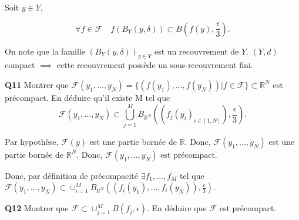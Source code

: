 \documentclass[french]{article}
\begin{document}
	Soit $y \in Y$,
	
	\[\forall f \in \mathcal{F} \quad f(B_Y(y, \delta)) \subset B\left(f(y), \frac{\epsilon}{3}\right).\]
	
	On note que la famille $(B_Y(y, \delta))_{y \in Y}$ est un recouvrement de $Y$. $(Y,d)$ compact $\implies$ cette recouvrement possède un sous-recouvrement fini.

	\begin{tcolorbox}[colback=gray!5!white,colframe=gray!75!black]
		\textbf{\large{Q11}} Montrer que $\mathcal{F}(y_1,...,y_N) = \{(f(y_1),...,f(y_N)) | f \in \mathcal{F}\} \subset \mathbb{R}^N$ est précompact. En déduire qu'il existe M tel que
		\[\mathcal{F}(y_1,...,y_N) \subset \bigcup_{j=1}^{M}B_{\mathbb{R}^N}\left((f_j(y_i)_{i\in[1,N]}), \frac{\epsilon}{3}\right).\]
	\end{tcolorbox}

	Par hypothèse, $\mathcal{F}(y)$ est une partie bornée de $\mathbb{R}$.
	Donc, $\mathcal{F}(y_1,...,y_N)$ est une partie bornée de $\mathbb{R}^N$.
	Donc, $\mathcal{F}(y_1,...,y_N)$ est précompact.
	
	Donc, par définition de précompacité $\exists f_1,...,f_M$ tel que $\mathcal{F}(y_1,...,y_N) \subset \cup_{i=1}^{M} B_{\mathbb{R}^N}\left( (f_i(y_1), ... , f_i(y_N)), \frac{\epsilon}{3}\right)$.

	\begin{tcolorbox}[colback=gray!5!white,colframe=gray!75!black]
		\textbf{\large{Q12}} Montrer que $\mathcal{F} \subset \cup_{j=1}^{M} B(f_j, \epsilon)$. En déduire que $\mathcal{F}$ est précompact.
	\end{tcolorbox}

	
	
\end{document}

